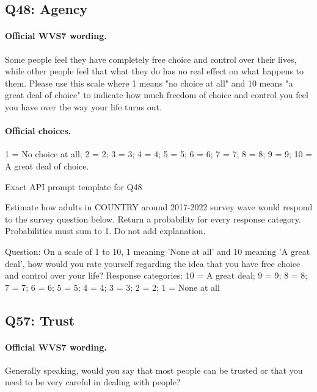 \subsection{Q48: Agency}

\paragraph{Official WVS7 wording.} Some people feel they have completely free choice and control over their lives, while other people feel that what they do has no real effect on what happens to them. Please use this scale where 1 means "no choice at all" and 10 means "a great deal of choice" to indicate how much freedom of choice and control you feel you have over the way your life turns out. \citep[p.~5]{wvs7masterquestionnaire}

\paragraph{Official choices.} 1 = No choice at all; 2 = 2; 3 = 3; 4 = 4; 5 = 5; 6 = 6; 7 = 7; 8 = 8; 9 = 9; 10 = A great deal of choice.

\begin{promptlisting}{Exact API prompt template for Q48}

Estimate how adults in {{COUNTRY}} around 2017-2022 survey wave would respond to the survey question below.
Return a probability for every response category. Probabilities must sum to 1. Do not add explanation.

Question: On a scale of 1 to 10, 1 meaning 'None at all' and 10 meaning 'A great deal', how would you rate yourself regarding the idea that you have free choice and control over your life?
Response categories: 10 = A great deal; 9 = 9; 8 = 8; 7 = 7; 6 = 6; 5 = 5; 4 = 4; 3 = 3; 2 = 2; 1 = None at all

\end{promptlisting}

\subsection{Q57: Trust}

\paragraph{Official WVS7 wording.} Generally speaking, would you say that most people can be trusted or that you need to be very careful in dealing with people? \citep[p.~6]{wvs7masterquestionnaire}

